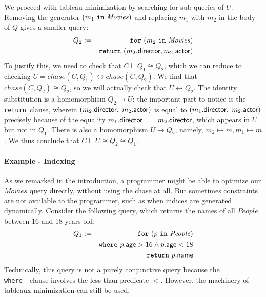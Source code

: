 \documentclass{sigplanconf}
\newcommand{\FOR}{{\tt for}\relax\ifmmode\ \else\xspace\fi}
\newcommand{\WHERE}{{\tt where}\relax\ifmmode\ \else\xspace\fi}
\newcommand{\IN}{ \ {\tt in} \ }
\newcommand{\RETURN}{{\tt return}\relax\ifmmode\ \else\xspace\fi}
\newcommand{\relation}[1]{\ensuremath{\mathit{#1}}\xspace}
\begin{document}
We proceed with tableau minimization by searching for sub-queries of $U$.
Removing the generator $(m_1 \IN \relation{Movies})$ and replacing $m_1$ with $m_2$ in the body of $Q$ gives a smaller query:
\begin{eqnarray*}
Q_2 & := & \FOR (m_2 \IN \relation{Movies}) \\
 & & \RETURN (m_2.{\sf director}, m_2.{\sf actor})
\end{eqnarray*}
To justify this, we need to check that $C \vdash Q_1 \cong Q_2$, which we can reduce to checking $U = chase(C,Q_1) \leftrightarrow chase(C, Q_2)$.
We find that $chase(C, Q_2) \cong Q_2$, so we will actually check that  $U \leftrightarrow Q_2$.
The identity substitution is a homomorphism $Q_2 \to U$: the important part to notice is the \RETURN clause, wherein $(m_2.{\sf director},$ $m_2.{\sf actor})$ is equal to $(m_1.{\sf director},$ $m_2.{\sf actor})$ precisely because of the equality $m_1.{\sf director}$ $=$ $m_2.{\sf director}$, which appears in $U$ but not in $Q_1$.
There is also a homomorphism $U \to Q_2$, namely, $m_2 \mapsto m, m_1 \mapsto m$.  We thus conclude that $C \vdash U \cong Q_2 \cong Q_1$. 

\paragraph{Example - Indexing}
As we remarked in the introduction, a programmer might be able to optimize our \relation{Movies} query directly, without using the chase at all.  But sometimes constraints are not available to the programmer, such as when indices are generated dynamically.  Consider the following query, which returns the names of all \relation{People} between 16 and 18 years old:
\begin{eqnarray*}
Q_1 & := & \FOR (p \IN \relation{People}) \\
 & & \WHERE p.{\sf age} > 16 \wedge p.{\sf age} < 18 \\
 & & \RETURN p.{\sf name}
\end{eqnarray*}
Technically, this query is not a purely conjunctive query because the \WHERE\ clause involves the less-than predicate $<$.
However, the machinery of tableaux minimization can still be used.
\end{document}
